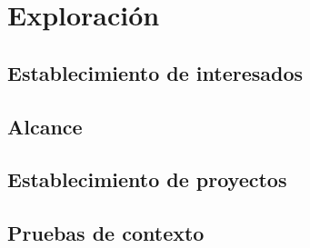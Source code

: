 \section{Exploración}
\subsection{Establecimiento de interesados}
\subsection{Alcance}
\subsection{Establecimiento de proyectos}
\subsection{Pruebas de contexto}

